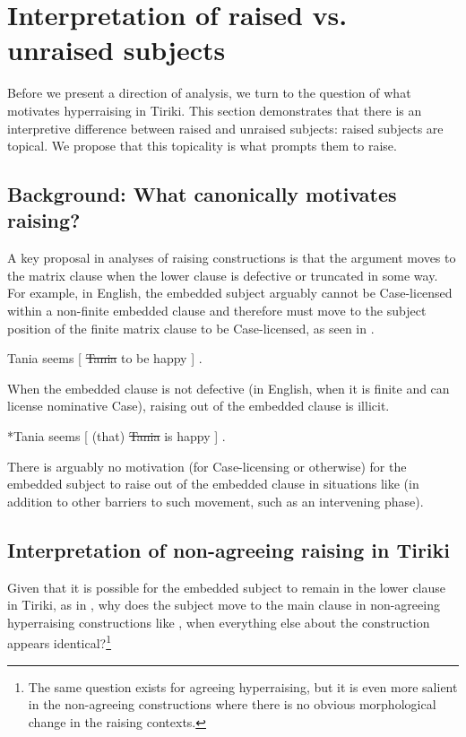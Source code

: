 \documentclass[output=paper,colorlinks,citecolor=brown
]{langscibook}
\begin{document}
\section{Interpretation of raised vs. unraised subjects} \label{sec:johnson:RaisedVsUnraised}

Before we present a direction of analysis, we turn to the question of what motivates hyperraising in Tiriki. This section demonstrates that there is an interpretive difference between raised and unraised subjects: raised subjects are topical. We propose that this topicality is what prompts them to raise.

\subsection{Background: What canonically motivates raising?}

A key proposal in analyses of raising constructions is that the argument moves to the matrix clause when the lower clause is defective or truncated in some way. For example, in English, the embedded subject arguably cannot be Case-licensed within a non-finite embedded clause and therefore must move to the subject position of the finite matrix clause to be Case-licensed, as seen in .


\ea \label{ex:johnson:EnglishDefectiveComp}
Tania seems {[} \sout{Tania} to be happy {]} .
\z 


When the embedded clause is not defective (in English, when it is finite and can license nominative Case), raising out of the embedded clause is illicit. 


\ea\label{ex:johnson:EnglishRaiseCP}

*Tania seems {[} (that) \sout{Tania} is happy {]} .

\z

\newpage
\noindent There is arguably no motivation (for Case-licensing or otherwise) for the embedded subject to raise out of the embedded clause in situations like  (in addition to other barriers to such movement, such as an intervening phase). 

\subsection{Interpretation of non-agreeing raising in Tiriki}

Given that it is possible for the embedded subject to remain in the lower clause in Tiriki, as in , why does the subject move to the main clause in non-agreeing hyperraising constructions like , when everything else about the construction appears identical?\footnote{The same question exists for agreeing hyperraising, but it is even more salient in the non-agreeing constructions where there is no obvious morphological change in the raising contexts.}
\end{document}
